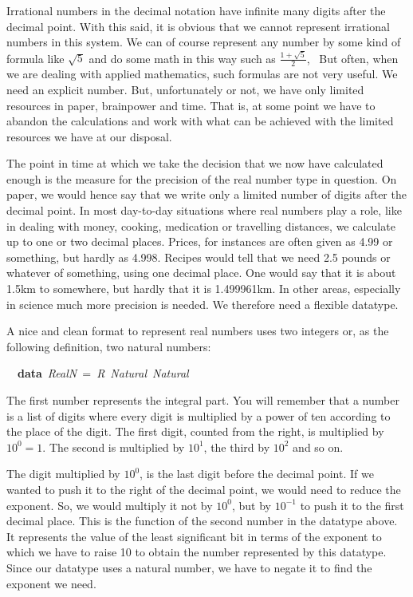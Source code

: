\documentclass[tikz]{scrreprt}
\newcommand{\texfamily}{\fontfamily{cmtex}\selectfont}
\begin{document}
Irrational numbers in the decimal notation
have infinite many digits after the decimal point.
With this said, it is obvious that we cannot
represent irrational numbers in this system.
We can of course represent any number by some
kind of formula like $\sqrt{5}$ and do some
math in this way such as $\frac{1+\sqrt{5}}{2}$,
\etc\ But often, when we are dealing with
applied mathematics, such formulas are not
very useful. We need an explicit number.
But, unfortunately or not, we have only
limited resources in paper, brainpower and
time. That is, at some point we have to 
abandon the calculations and work with what
can be achieved with the limited resources
we have at our disposal.

The point in time at which we take
the decision that we now have calculated
enough is the measure for the precision
of the real number type in question.
On paper, we would hence say that we
write only a limited number of digits
after the decimal point. In most day-to-day
situations where real numbers play a role,
like in dealing with money, cooking,
medication or travelling distances,
we calculate up to one or two decimal places.
Prices, for instances are often given 
as 4.99 or something, but hardly as 4.998.
Recipes would tell that we need 2.5 pounds
or whatever of something, using one decimal place.
One would say that it is about 1.5km 
to somewhere, but hardly that it is 1.499961km.
In other areas, especially in science 
much more precision is needed.
We therefore need a flexible datatype.

A nice and clean format to represent
real numbers uses two integers or,
as the following definition,
two natural numbers:

\begin{minipage}{\textwidth}
\begin{tabbing}\texfamily
~~{\bfseries data}~{\itshape RealN}~=~{\itshape R}~{\itshape Natural}~{\itshape Natural}
\end{tabbing}
\end{minipage}

The first number represents the integral part.
You will remember that a number is a list
of digits where every digit is multiplied
by a power of ten according to the place
of the digit. The first digit, counted from the right,
is multiplied by $10^0=1$. The second is 
multiplied by $10^1$, the third by $10^2$
and so on. 

The digit multiplied by $10^0$,
is the last digit before the decimal point.
If we wanted to push it to the right
of the decimal point, we would need
to reduce the exponent. So, we would multiply it
not by $10^0$, but by $10^{-1}$ to push it
to the first decimal place.
This is the function of the second number
in the datatype above.
It represents the value of the 
least significant bit in terms of
the exponent to which we have to raise 10 
to obtain the number represented by this datatype.
Since our datatype uses a natural number,
we have to negate it to find the exponent we need.
\end{document}
